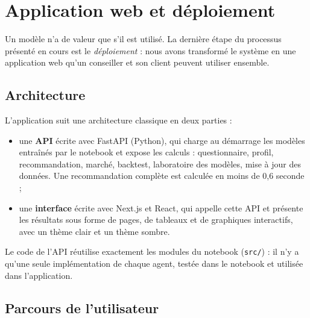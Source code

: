 \section{Application web et déploiement}
\label{sec:application}

Un modèle n'a de valeur que s'il est utilisé. La dernière étape du processus présenté en cours est le \emph{déploiement} : nous avons transformé le système en une application web qu'un conseiller et son client peuvent utiliser ensemble.

\subsection{Architecture}

L'application suit une architecture classique en deux parties :
\begin{itemize}
  \item une \textbf{API} écrite avec FastAPI (Python), qui charge au démarrage les modèles entraînés par le notebook et expose les calculs : questionnaire, profil, recommandation, marché, backtest, laboratoire des modèles, mise à jour des données. Une recommandation complète est calculée en moins de 0,6 seconde ;
  \item une \textbf{interface} écrite avec Next.js et React, qui appelle cette API et présente les résultats sous forme de pages, de tableaux et de graphiques interactifs, avec un thème clair et un thème sombre.
\end{itemize}
Le code de l'API réutilise exactement les modules du notebook (\texttt{src/}) : il n'y a qu'une seule implémentation de chaque agent, testée dans le notebook et utilisée dans l'application.

\subsection{Parcours de l'utilisateur}


